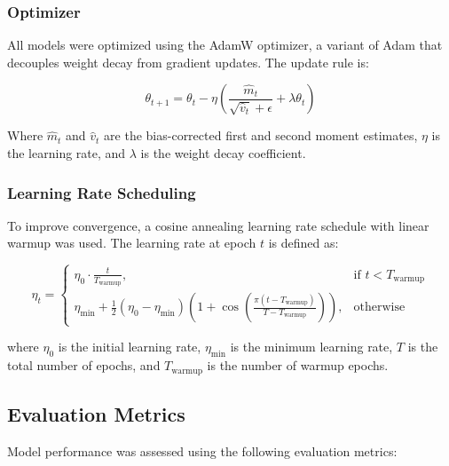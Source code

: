 \documentclass[11pt]{article}
\begin{document}
\subsubsection*{Optimizer}

All models were optimized using the AdamW optimizer, a variant of Adam that decouples weight decay from gradient updates. The update rule is:

\[
\theta_{t+1} = \theta_t - \eta \left( \frac{\hat{m}_t}{\sqrt{\hat{v}_t} + \epsilon} + \lambda \theta_t \right)
\]

Where  \( \hat{m}_t \) and \( \hat{v}_t \) are the bias-corrected first and second moment estimates,  \( \eta \) is the learning rate, and \( \lambda \) is the weight decay coefficient.


\subsubsection*{Learning Rate Scheduling}

To improve convergence, a cosine annealing learning rate schedule with linear warmup was used. The learning rate at epoch \( t \) is defined as:

\[
\eta_t =
\begin{cases}
\eta_0 \cdot \frac{t}{T_{\text{warmup}}}, & \text{if } t < T_{\text{warmup}} \\
\eta_{\text{min}} + \frac{1}{2}(\eta_0 - \eta_{\text{min}}) \left(1 + \cos\left( \frac{\pi (t - T_{\text{warmup}})}{T - T_{\text{warmup}}} \right) \right), & \text{otherwise}
\end{cases}
\]

where \( \eta_0 \) is the initial learning rate, \( \eta_{\text{min}} \) is the minimum learning rate, \( T \) is the total number of epochs, and \( T_{\text{warmup}} \) is the number of warmup epochs.

\subsection*{Evaluation Metrics}

Model performance was assessed using the following evaluation metrics:
\end{document}
